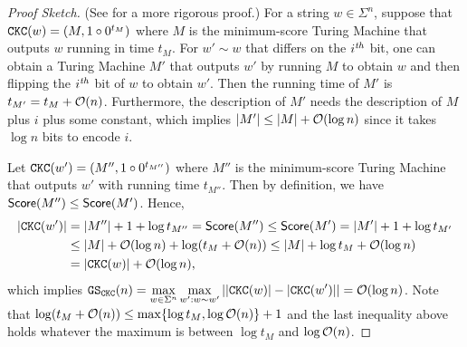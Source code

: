 \begin{proof}[Proof Sketch] (See  for a more rigorous proof.)
    For a string $w\in\Sigma^n$, suppose that $\mathtt{CKC}(w)=(M,1\circ0^{t_M})$ where $M$ is the minimum-score Turing Machine that outputs $w$ running in time $t_M$. For $w'\sim w$ that differs on the $i^{\mbox{\scriptsize{\textit{th}}}}$ bit, one can obtain a Turing Machine $M'$ that outputs $w'$ by running $M$ to obtain $w$ and then flipping the $i^{\mbox{\scriptsize{\textit{th}}}}$ bit of $w$ to obtain $w'$. 
    Then the running time of $M'$ is $t_{M'}=t_M+\O{n}$. Furthermore, the description of $M'$ needs the description of $M$ plus $i$ plus some constant, which implies $|M'|\leq|M|+\O{\log n}$ since it takes $\log n$ bits to encode $i$.

    Let $\mathtt{CKC}(w')=(M'',1\circ0^{t_{M''}})$ where $M''$ is the minimum-score Turing Machine that outputs $w'$ with running time $t_{M''}$. Then by definition, we have $\mathsf{Score}(M'')\leq\mathsf{Score}(M')$. Hence,
    \begin{align*}
        |\ckc(w')| &= |M''|+1+\log t_{M''}   =\score(M'')
        \leq \score(M')  = |M'|+1+\log t_{M'} \\
         &\leq |M|+\O{\log n} + \log(t_M+\O{n})         \leq |M|+ \log t_M + \O{\log n} \\
         &         =|\ckc(w)| + \O{\log n},
    \end{align*}
    which implies $\displaystyle\GS_\ckc(n)=\max_{w\in\Sigma^n}\max_{w':w\sim w'}||\ckc(w)|-|\ckc(w')||=\O{\log n}$. Note that $\log(t_M+\O{n})\leq\max\{\log t_M,\log\O{n}\}+1$ and the last inequality above holds whatever the maximum is between $\log t_M$ and $\log\O{n}$. 
\end{proof}